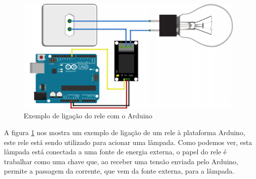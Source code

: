 \begin{figure}[H]
\centering
\includegraphics[scale=0.5]{./04-figuras/rele-exemplo.png}
\caption{Exemplo de ligação do rele com o Arduino}
\vspace{-\baselineskip}
\label{fig:releligacao}
\end{figure}

A figura \ref{fig:releligacao} nos mostra um exemplo de ligação de um rele à plataforma Arduino, este rele está sendo utilizado para acionar uma lâmpada. Como podemos ver, esta lâmpada está conectada a uma fonte de energia externa, o papel do rele é trabalhar como uma chave que, ao receber uma tensão enviada pelo Arduino, permite a passagem da corrente, que vem da fonte externa, para a lâmpada.